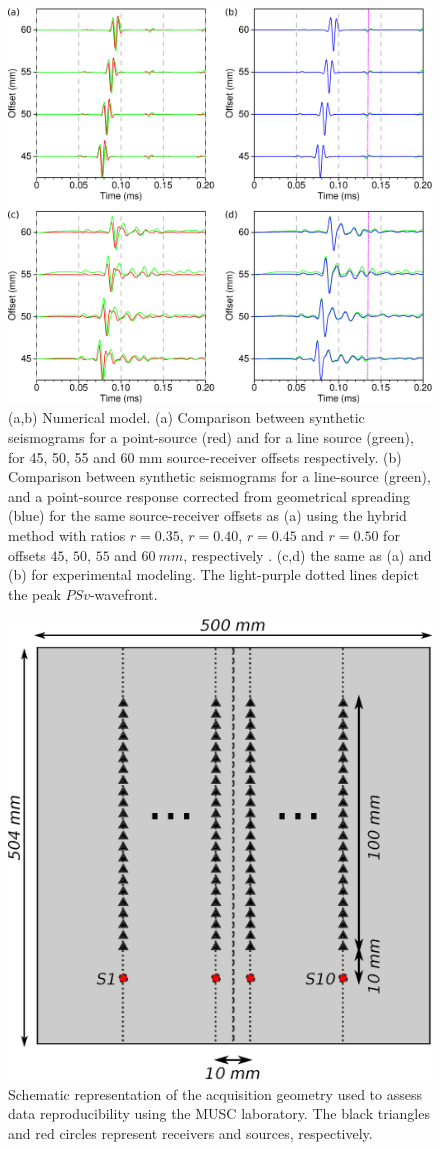 \documentclass[paper,extra]{gji} %
\begin{document}
\begin{figure}[!h]
\centering
\includegraphics[width=0.75\columnwidth]{fig/trans2d3d.eps}
\caption{(a,b) Numerical model. (a) Comparison between synthetic seismograms for a point-source (red) and for a line source (green), for 45, 50, 55 and 60 mm source-receiver offsets respectively. (b) Comparison between synthetic seismograms for a line-source (green), and a point-source response corrected from geometrical spreading (blue) for the same source-receiver offsets as (a) using the hybrid method with ratios $r=0.35$, $r=0.40$, $r=0.45$ and $r=0.50$ for offsets $45$, $50$, $55$ and $60\ mm$, respectively . (c,d) the same as (a) and (b) for experimental modeling. The light-purple dotted lines depict the peak $PSv$-wavefront.}%
\label{panel_amplitude_sem}
\end{figure}

\begin{figure}[!h]
\centering
\includegraphics[width=0.75\columnwidth]{fig/reproducibility_acqui_principle.eps}
\caption{Schematic representation of the acquisition geometry used to assess data reproducibility using the MUSC laboratory. The black triangles and red circles represent receivers and sources, respectively.}
\label{reproducibility_acqui_principle}
\end{figure}
\end{document}
